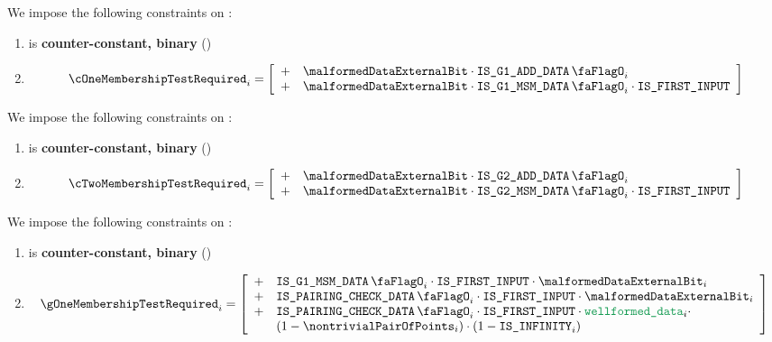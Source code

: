 We impose the following constraints on \cOneMembershipTestRequired{}:
\begin{enumerate}
    \item \cOneMembershipTestRequired{} is \textbf{counter-constant, binary} \quad (\trash)
    \item
        \[  
        \cOneMembershipTestRequired_{i} = 
        \left[ \begin{array}{clcr}
            + & \malformedDataExternalBit \cdot \isBlsGOneAddData_{i} \\
            + & \malformedDataExternalBit \cdot \isBlsGOneMsmData_{i} \cdot \isFirstInput \\
        \end{array} \right] \vspace{2mm}  
        \]
\end{enumerate}
We impose the following constraints on \cTwoMembershipTestRequired{}:
\begin{enumerate}
    \item \cTwoMembershipTestRequired{} is \textbf{counter-constant, binary} \quad (\trash)
    \item 
        \[  
        \cTwoMembershipTestRequired_{i} = 
        \left[ \begin{array}{clcr}
            + & \malformedDataExternalBit \cdot \isBlsGTwoAddData_{i} \\
            + & \malformedDataExternalBit \cdot \isBlsGTwoMsmData_{i} \cdot \isFirstInput \\
        \end{array} \right] \vspace{2mm}  
        \]
\end{enumerate}
We impose the following constraints on \gOneMembershipTestRequired{}:
\begin{enumerate}
    \item \gOneMembershipTestRequired{} is \textbf{counter-constant, binary} \quad (\trash)
    \item 
        \[
            \gOneMembershipTestRequired_{i} = 
            \left[ \begin{array}{cl} 
                + & \isBlsGOneMsmData_{i} \cdot \isFirstInput \cdot \malformedDataExternalBit_{i}  \\
                + & \isBlsPairingCheckData_{i} \cdot \isFirstInput \cdot \malformedDataExternalBit_{i} \\
                + & \isBlsPairingCheckData_{i} \cdot \isFirstInput \cdot \locWellformedData_{i} \cdot \\
                & (1 - \nontrivialPairOfPoints_{i}) \cdot (1 - \isInfinity_{i}) \\
            \end{array} \right] \\
        \]
\end{enumerate}
